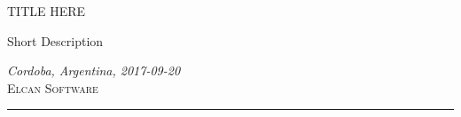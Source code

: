 \documentclass[a4paper]{article}
\author{%
	Mario O. Villarroel \\
	Customer Care/System Design\\
	\texttt{movilla@elcansoftware.com}\vspace{20pt} \\
	Juan P. Aguilar\\
	System Development \\
	\texttt{aguilarjpb@elcansoftware.com}
}
\def\documentdate{Cordoba, Argentina, 2017-09-20}
\begin{document}
	\begin{titlepage}
		\noindent
		\titlefont TITLE HERE \par
		\epigraph{Short Description}%
		{\textit{\documentdate}\\ \textsc{Elcan Software}}
		\null\vfill
		\vspace*{1cm}
		\noindent
		\hfill
		\begin{minipage}{0.50\linewidth}
		    \begin{flushright}
		        \printauthor
		    \end{flushright}
		\end{minipage}
		\begin{minipage}{0.02\linewidth}
		    \rule{1pt}{125pt}
		\end{minipage}
		\titlepagedecoration
	\end{titlepage}
	
	
\end{document}
